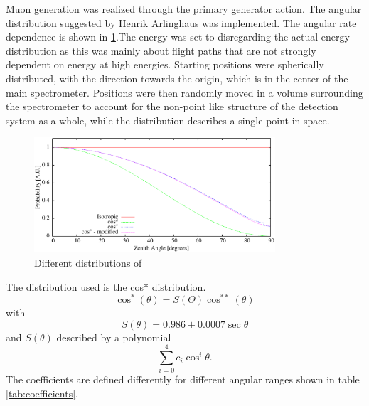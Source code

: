   Muon generation was realized through the primary generator action. The angular distribution suggested by Henrik Arlinghaus \cite{DTArlinghaus} was implemented. The angular rate dependence is shown in \ref{fig:rateDependance}.The energy was set to  disregarding the actual energy distribution as this was mainly about flight paths that are not strongly dependent on energy at high energies. Starting positions were spherically distributed, with the direction towards the origin, which is in the center of the main spectrometer. Positions were then randomly moved in a volume surrounding the spectrometer to account for the non-point like structure of the detection system as a whole, while the distribution describes a single point in space.
  \begin{figure}
  \centering
  \includegraphics[width = 0.8\textwidth]{graphics/simulation/angularDistributions.eps}
  	\caption[Muon rate dependance on zenith angle]{Different distributions of }
  	\label{fig:rateDependance}
  \end{figure}
  The distribution used is the cos* distribution.
  \begin{equation}
  	\cos^*{\left(\theta \right)} = S(\Theta)\cos^{**}{\left(\theta\right)}
  \end{equation}
  with
  \begin{equation}
  	S(\theta) = 0.986 + 0.0007\sec{\theta}
  \end{equation}
  and $S(\theta)$ described by a polynomial
  \begin{equation}
  	\sum_{i=0}^{4}{c_i \cos^i{\theta}}.
  	\label{eq:coeffs}
  \end{equation}
  The coefficients are defined differently for different angular ranges shown in table \ref{tab:coefficients}.
